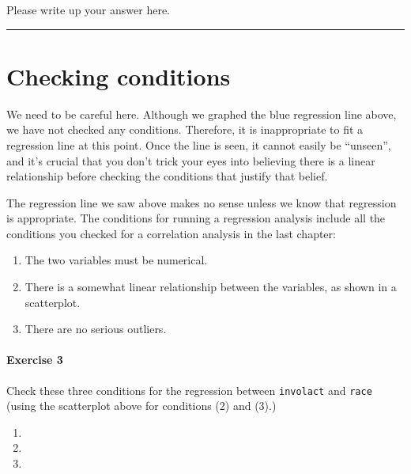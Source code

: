 \documentclass[
]{book}
\providecommand{\tightlist}{%
  \setlength{\itemsep}{0pt}\setlength{\parskip}{0pt}}
\begin{document}
Please write up your answer here.

\begin{center}\rule{0.5\linewidth}{0.5pt}\end{center}

\hypertarget{regression-conditions}{%
\section{Checking conditions}\label{regression-conditions}}

We need to be careful here. Although we graphed the blue regression line above, we have not checked any conditions. Therefore, it is inappropriate to fit a regression line at this point. Once the line is seen, it cannot easily be ``unseen'', and it's crucial that you don't trick your eyes into believing there is a linear relationship before checking the conditions that justify that belief.

The regression line we saw above makes no sense unless we know that regression is appropriate. The conditions for running a regression analysis include all the conditions you checked for a correlation analysis in the last chapter:

\begin{enumerate}
\def\labelenumi{\arabic{enumi}.}
\tightlist
\item
  The two variables must be numerical.
\item
  There is a somewhat linear relationship between the variables, as shown in a scatterplot.
\item
  There are no serious outliers.
\end{enumerate}

\hypertarget{exercise-3-3}{%
\paragraph*{Exercise 3}\label{exercise-3-3}}

Check these three conditions for the regression between \texttt{involact} and \texttt{race} (using the scatterplot above for conditions (2) and (3).)

\begin{enumerate}
\def\labelenumi{\arabic{enumi}.}
\tightlist
\item
\item
\item
\end{enumerate}
\end{document}
